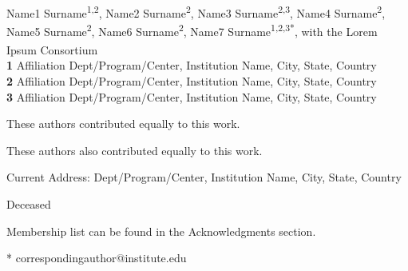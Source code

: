 \documentclass[10pt,letterpaper]{article}
\begin{document}
\vspace*{0.2in}

\begin{flushleft}
{\Large
\textbf{} %
}
\newline
\\
Name1 Surname\textsuperscript{1,2\Yinyang},
Name2 Surname\textsuperscript{2\Yinyang},
Name3 Surname\textsuperscript{2,3\textcurrency},
Name4 Surname\textsuperscript{2},
Name5 Surname\textsuperscript{2\ddag},
Name6 Surname\textsuperscript{2\ddag},
Name7 Surname\textsuperscript{1,2,3*},
with the Lorem Ipsum Consortium\textsuperscript{\textpilcrow}
\\
\bigskip
\textbf{1} Affiliation Dept/Program/Center, Institution Name, City, State, Country
\\
\textbf{2} Affiliation Dept/Program/Center, Institution Name, City, State, Country
\\
\textbf{3} Affiliation Dept/Program/Center, Institution Name, City, State, Country
\\
\bigskip

% 
%
\Yinyang These authors contributed equally to this work.

\ddag These authors also contributed equally to this work.

\textcurrency Current Address: Dept/Program/Center, Institution Name, City, State, Country %

\dag Deceased

\textpilcrow Membership list can be found in the Acknowledgments section.

* correspondingauthor@institute.edu

\end{flushleft}
\end{document}
